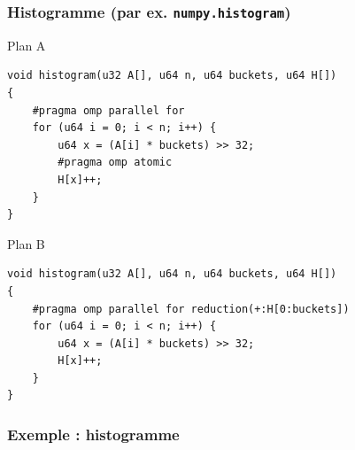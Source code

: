 \documentclass[xcolor={x11names,svgnames},x11names,svgnames]{beamer}
\begin{document}
\begin{frame}[fragile]
  \frametitle{Histogramme (par ex. \texttt{numpy.histogram})}


  \begin{block}{Plan A}
\begin{verbatim}
void histogram(u32 A[], u64 n, u64 buckets, u64 H[])
{
    #pragma omp parallel for
    for (u64 i = 0; i < n; i++) {
        u64 x = (A[i] * buckets) >> 32;
        #pragma omp atomic
        H[x]++;
    }
}
\end{verbatim}
  \end{block}

    \begin{block}{Plan B}
\begin{verbatim}
void histogram(u32 A[], u64 n, u64 buckets, u64 H[])
{
    #pragma omp parallel for reduction(+:H[0:buckets])
    for (u64 i = 0; i < n; i++) {
        u64 x = (A[i] * buckets) >> 32;
        H[x]++;
    }
}
\end{verbatim}
  \end{block}

\end{frame}


\begin{frame}[label=histogram_curve]
  \frametitle{Exemple : histogramme}

\end{frame}
\end{document}
